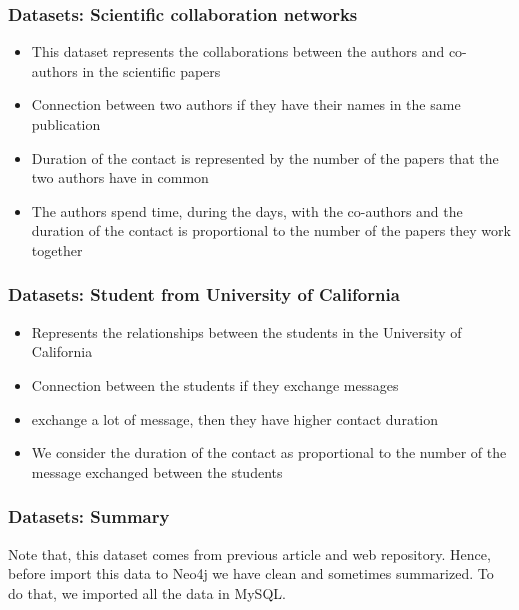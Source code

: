 \documentclass{beamer}
\begin{document}
\begin{frame}
\frametitle{Datasets: Scientific collaboration networks}
\begin{itemize}
\item This dataset represents the collaborations between the authors and co-authors in the scientific papers
\item Connection between two authors if they have their names in the same publication
\item Duration of the contact is represented by the number of the papers that the two authors have in common
\item The authors spend time, during the days, with the co-authors and the duration of the contact is proportional to the number of the papers they work together
\end{itemize}
\end{frame}

\begin{frame}
\frametitle{Datasets: Student from University of California}
\begin{itemize}
\item Represents the relationships between the students in the University of California
\item Connection between the students if they exchange messages
\item exchange a lot of message, then they have higher contact duration
\item We consider the duration of the contact as proportional to the number of the message exchanged between the students
\end{itemize}
\end{frame}

\begin{frame}
\frametitle{Datasets: Summary}
\begin{table}[H] \label{Tab:1}
\centering
{}
\caption{Summary of the datasets}
\end{table}

Note that, this dataset comes from previous article and web repository. Hence, before import this data to Neo4j we have clean and sometimes summarized. To do that, we imported all the data in MySQL.
\end{frame}
\end{document}
